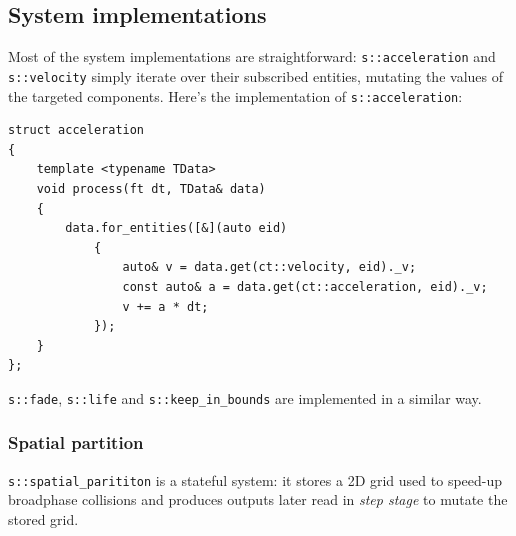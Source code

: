 \documentclass[twoside, 12pt, a4paper, openany]{book}
\begin{document}
\subsection{System implementations}\label{system-implementations}

Most of the system implementations are straightforward:
\texttt{s::acceleration}
and
\texttt{s::velocity}
simply iterate over their subscribed entities, mutating the values of
the targeted components. Here's the implementation of
\texttt{s::acceleration}:

\begin{verbatim}
struct acceleration
{
    template <typename TData>
    void process(ft dt, TData& data)
    {
        data.for_entities([&](auto eid)
            {
                auto& v = data.get(ct::velocity, eid)._v;
                const auto& a = data.get(ct::acceleration, eid)._v;
                v += a * dt;
            });
    }
};
\end{verbatim}

\texttt{s::fade},
\texttt{s::life}
and
\texttt{s::keep_in_bounds}
are implemented in a similar way.

\subsubsection{Spatial partition}\label{spatial-partition}

\texttt{s::spatial_parititon}
is a stateful system: it stores a 2D grid used to speed-up broadphase
collisions and produces outputs later read in \emph{step stage} to
mutate the stored grid.
\end{document}

